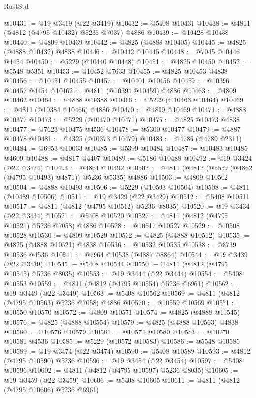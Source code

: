 \begin{lexlean}{RustStd}
\begin{coremodule}
{\begin{coremodule}
{{{{{{{{{{{{{{{{{{{{{{{{{{{{{{{{{{{{{{{{{{{{{{{{{{{{{{{{{{{{{{{{{{{{{{{{{{{{{{{{@10431 := @19 @3419 (@22 @3419)
@10432 := @5408 @10431
@10438 := @4811 (@4812 (@4795 @10432) @5236 @7037) @4886
@10439 := @10428 @10438
@10440 := @4809 @10439
@10442 := @4825 (@4888 @10405)
@10445 := @4825 (@4888 @10432) @4838
@10446 := @10442 @10445
@10448 := @7045 @10446 @4454
@10450 := @5229 (@10440 @10448)
@10451 := @4825 @10450
@10452 := @5548 @5351
@10453 := @10452 @7633
@10455 := @4825 @10453 @4838
@10456 := @10451 @10455
@10457 := @10401 @10456
@10459 := @10396 @10457 @4454
@10462 := @4811 (@10394 @10459) @4886
@10463 := @4809 @10462
@10464 := @4888 @10388
@10466 := @5229 (@10463 @10464)
@10469 := @4811 (@10384 @10466) @4886
@10470 := @4809 @10469
@10471 := @4888 @10377
@10473 := @5229 (@10470 @10471)
@10475 := @4825 @10473 @4838
@10477 := @7623 @10475 @4536
@10478 := @5300 @10477
@10479 := @4887 @10478
@10481 := @4325 (@10373 @10479)
@10483 := @4786 (@4789 @2311)
@10484 := @6953 @10033
@10485 := @5399 @10484
@10487 := @10483 @10485 @4609
@10488 := @4817 @4407
@10489 := @5186 @10488
@10492 := @19 @3424 (@22 @3424)
@10493 := @4864 @10492
@10502 := @4811 (@4812 (@5559 (@4862 (@4795 @10493) @4871)) @5236 @5335) @4886
@10503 := @4809 @10502
@10504 := @4888 @10493
@10506 := @5229 (@10503 @10504)
@10508 := @4811 (@10489 @10506)
@10511 := @19 @3429 (@22 @3429)
@10512 := @5408 @10511
@10517 := @4811 (@4812 (@4795 @10512) @5236 @8035)
@10520 := @19 @3434 (@22 @3434)
@10521 := @5408 @10520
@10527 := @4811 (@4812 (@4795 @10521) @5236 @7058) @4886
@10528 := @10517 @10527
@10529 := @10508 @10528
@10530 := @4809 @10529
@10532 := @4825 (@4888 @10512)
@10535 := @4825 (@4888 @10521) @4838
@10536 := @10532 @10535
@10538 := @8739 @10536 @4536
@10541 := @7964 @10538 (@4887 @8864)
@10544 := @19 @3439 (@22 @3439)
@10545 := @5408 @10544
@10550 := @4811 (@4812 (@4795 @10545) @5236 @8035)
@10553 := @19 @3444 (@22 @3444)
@10554 := @5408 @10553
@10559 := @4811 (@4812 (@4795 @10554) @5236 @6961)
@10562 := @19 @3449 (@22 @3449)
@10563 := @5408 @10562
@10569 := @4811 (@4812 (@4795 @10563) @5236 @7058) @4886
@10570 := @10559 @10569
@10571 := @10550 @10570
@10572 := @4809 @10571
@10574 := @4825 (@4888 @10545)
@10576 := @4825 (@4888 @10554)
@10579 := @4825 (@4888 @10563) @4838
@10580 := @10576 @10579
@10581 := @10574 @10580
@10583 := @10270 @10581 @4536
@10585 := @5229 (@10572 @10583)
@10586 := @5548 @10585
@10589 := @19 @3474 (@22 @3474)
@10590 := @5408 @10589
@10593 := @4812 (@4795 @10590) @5236
@10596 := @19 @3454 (@22 @3454)
@10597 := @5408 @10596
@10602 := @4811 (@4812 (@4795 @10597) @5236 @8035)
@10605 := @19 @3459 (@22 @3459)
@10606 := @5408 @10605
@10611 := @4811 (@4812 (@4795 @10606) @5236 @6961)
}}}}}}}}}}}}}}}}}}}}}}}}}}}}}}}}}}}}}}}}}}}}}}}}}}}}}}}}}}}}}}}}}}}}}}}}}}}}}}}}
\end{coremodule}}
\end{coremodule}
\end{lexlean}
